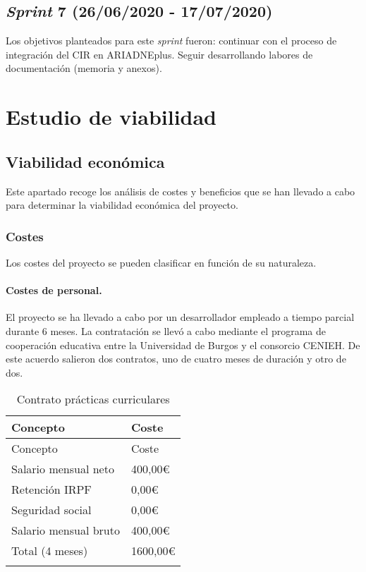\subsection{\emph{Sprint} 7 (26/06/2020 - 17/07/2020)}
Los objetivos planteados para este \emph{sprint} fueron: continuar con
el proceso de integración del CIR en ARIADNEplus. Seguir desarrollando
labores de documentación (memoria y anexos).

\section{Estudio de viabilidad}

\subsection{Viabilidad económica}

Este apartado recoge los análisis de costes y beneficios que se han
llevado a cabo para determinar la viabilidad económica del proyecto.

\subsubsection{Costes}

Los costes del proyecto se pueden clasificar en función de su
naturaleza.

\paragraph{Costes de personal.}

El proyecto se ha llevado a cabo por un desarrollador empleado a tiempo
parcial durante 6 meses. La contratación se llevó a cabo mediante el
programa de cooperación educativa entre la Universidad de Burgos y el
consorcio CENIEH. De este acuerdo salieron dos contratos, uno de cuatro
meses de duración y otro de dos.

\begin{longtable}[]{@{}ll@{}}
\toprule
Concepto & Coste\tabularnewline
\midrule
\endfirsthead
\toprule
Concepto & Coste\tabularnewline
\midrule
\endhead
Salario mensual neto & 400,00\euro{}\tabularnewline
Retención IRPF & 0,00\euro{}\tabularnewline
Seguridad social & 0,00\euro{}\tabularnewline
Salario mensual bruto & 400,00\euro{}\tabularnewline
Total (4 meses) & 1600,00\euro{}\tabularnewline
\bottomrule
\caption{Contrato prácticas curriculares}
\end{longtable}

